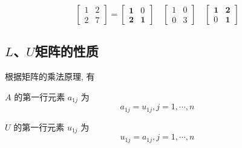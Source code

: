 \begin{example}
    $$ \left[\begin{array}{ll}1 & 2 \\ 2 & 7\end{array}\right]=\left[\begin{array}{ll}\mathbf{1} & 0 \\ \mathbf{2} & \mathbf{1}\end{array}\right] \quad\left[\begin{array}{ll}1 & 0 \\ 0 & 3\end{array}\right] \quad\left[\begin{array}{ll}\mathbf{1} & \mathbf{2} \\ 0 & \mathbf{1}\end{array}\right] $$
\end{example}


\subsection{$L$、$U$矩阵的性质}

根据矩阵的乘法原理, 有

\begin{theorem}
    $ A $ 的第一行元素 $ a_{1 j} $ 为
    $$
        a_{1 j}=u_{1 j}, j=1, \cdots, n
    $$
\end{theorem}

\begin{corollary}
    $ U $ 的第一行元素 $ u_{1 j} $ 为
    $$
        u_{1 j}=a_{1 j}, j=1, \cdots, n
    $$
\end{corollary}


